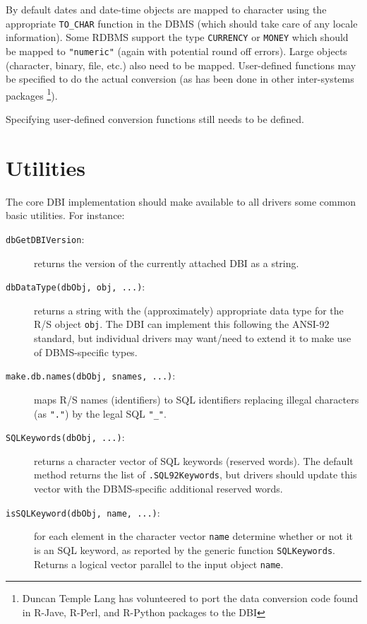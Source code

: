 \documentclass{article}
\newcommand{\sobj}[1]{\mbox{\tt #1}}    %
\newcommand{\smethod}[1]{\mbox{\tt #1}} %
\begin{document}
By default dates and date-time objects are mapped to character
using the appropriate \texttt{TO\_CHAR} function in the DBMS
(which should take care of any locale information).  Some RDBMS
support the type \texttt{CURRENCY} or \texttt{MONEY} which should be
mapped to \sobj{"numeric"} (again with potential round off errors).
Large objects (character, binary, file, etc.) also need to be mapped.
User-defined functions may be specified to do the actual conversion
(as has been done in other inter-systems packages \footnote{
  Duncan Temple Lang has volunteered to port the data conversion 
  code found in R-Jave, R-Perl, and R-Python packages to the DBI}).

Specifying user-defined conversion functions still needs to be 
defined.

\section{Utilities}\label{sec:utilities}
The core DBI implementation should make available to all
drivers some common basic utilities.  For instance:
\begin{description}
\item[\smethod{dbGetDBIVersion}:]
  returns the version of the currently attached DBI as a string.

\item[\smethod{dbDataType(dbObj, obj, ...)}:]
  returns a string with the (approximately) appropriate data type for
  the R/S object \sobj{obj}.  The DBI can implement this following
  the ANSI-92 standard, but individual drivers may want/need to extend
  it to make use of DBMS-specific types.

\item[\smethod{make.db.names(dbObj, snames, ...)}:]
  maps R/S names (identifiers) to SQL identifiers replacing 
  illegal characters (as \sobj{"."}) by the legal SQL \sobj{"\_"}.

\item[\sobj{SQLKeywords(dbObj, ...)}:]
  returns a character vector of SQL keywords (reserved words).  
  The default method returns the list of \sobj{.SQL92Keywords},
  but drivers should update this vector with the DBMS-specific
  additional reserved words.

\item[\smethod{isSQLKeyword(dbObj, name, ...)}:]
  for each element in the character vector \sobj{name} determine 
  whether or not it is an SQL keyword, as reported by the 
  generic function \smethod{SQLKeywords}.  Returns a logical vector
  parallel to the input object \sobj{name}.

\end{description}
\end{document}
